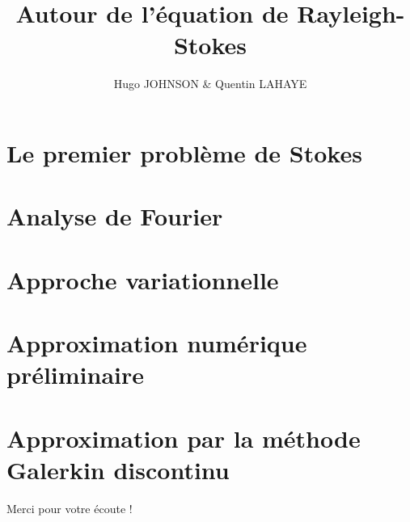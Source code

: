\documentclass[10pt,svgnames,fragile]{beamer}
\subtitle{}
\institute[]{} \usetheme{CambridgeUS}
\author{Hugo JOHNSON \& Quentin LAHAYE}
\date{}
\title{Autour de l'équation de Rayleigh-Stokes}
\begin{document}
\maketitle



\footnotesize\tableofcontents

\section{Le premier problème de Stokes}


\section{Analyse de Fourier}



\section{Approche variationnelle}



\section{Approximation numérique préliminaire}


\section{Approximation par la méthode Galerkin discontinu}



\begin{frame}
    \begin{center}
        \Large Merci pour votre écoute !
    \end{center}
\end{frame}
\end{document}
